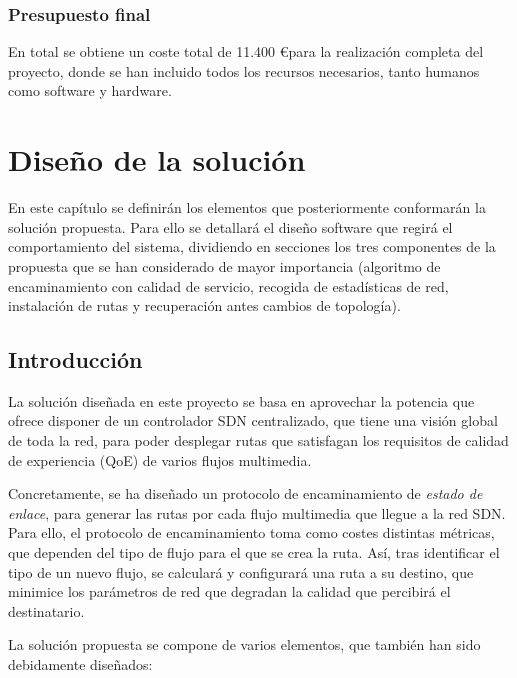 \documentclass[a4paper,11pt]{book}
\begin{document}
\subsection{Presupuesto final}
En total se obtiene un coste total de 11.400 \euro para la realización completa del proyecto, donde se han incluido todos los recursos necesarios, tanto humanos como software y hardware.


%
%
\chapter{Diseño de la solución}\label{design}

En este capítulo se definirán los elementos que posteriormente conformarán la solución propuesta. Para ello se detallará el diseño software que regirá el comportamiento del sistema, dividiendo en secciones los tres componentes de la propuesta que se han considerado de mayor importancia (algoritmo de encaminamiento con calidad de servicio, recogida de estadísticas de red, instalación de rutas y recuperación antes cambios de topología).



\section{Introducción}
 La solución diseñada en este proyecto se basa en aprovechar la potencia que ofrece disponer de un controlador \ac{SDN} centralizado, que tiene una visión global de toda la red, para poder desplegar rutas que satisfagan los requisitos de calidad de experiencia (\ac{QoE}) de varios flujos multimedia.
 
 Concretamente, se ha diseñado un protocolo de encaminamiento de \emph{estado de enlace}, para generar las rutas por cada flujo multimedia que llegue a la red \ac{SDN}. Para ello, el protocolo de encaminamiento toma como costes distintas métricas, que dependen del tipo de flujo para el que se crea la ruta. Así, tras identificar el tipo de un nuevo flujo, se calculará y configurará una ruta a su destino, que minimice los parámetros de red que degradan la calidad que percibirá el destinatario.
 
 La solución propuesta se compone de varios elementos, que también han sido debidamente diseñados:
  
\end{document}
